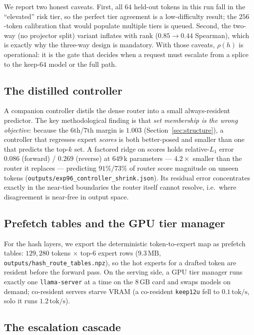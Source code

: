 \documentclass[11pt]{article}
\newcommand{\keepm}[1]{\texttt{keep#1}}
\newcommand{\code}[1]{\texttt{#1}}
\newcommand{\gb}{\,\textrm{GB}}
\newcommand{\tps}{\,\textrm{tok/s}}
\begin{document}
We report two honest caveats. First, all $64$ held-out tokens in this run fall
in the ``elevated'' risk tier, so the perfect tier agreement is a low-difficulty
result; the $256$-token calibration that would populate multiple tiers is queued.
Second, the two-way (no projector split) variant inflates with rank ($0.85\to
0.44$ Spearman), which is exactly why the three-way design is mandatory. With
those caveats, $\rho(h)$ is operational: it is the gate that decides when a
request must escalate from a splice to the keep-$64$ model or the full path.

\subsection{The distilled controller}
\label{sec:controller}

A companion controller distils the dense router into a small always-resident
predictor. The key methodological finding is that \emph{set membership is the
wrong objective}: because the $6$th/$7$th margin is $1.003$
(Section~\ref{sec:structure}), a controller that regresses expert \emph{scores}
is both better-posed and smaller than one that predicts the top-$k$ set. A
factored ridge on scores holds relative-$L_1$ error $0.086$ (forward) / $0.269$
(reverse) at $649\,\textrm{k}$ parameters --- $4.2\times$ smaller than the router
it replaces --- predicting $91\%/73\%$ of router score magnitude on unseen
tokens (\code{outputs/exp96\_controller\_shrink.json}). Its residual error
concentrates exactly in the near-tied boundaries the router itself cannot
resolve, i.e.\ where disagreement is near-free in output space.

\subsection{Prefetch tables and the GPU tier manager}

For the hash layers, we export the deterministic token-to-expert map as prefetch
tables: $129{,}280$ tokens $\times$ top-$6$ expert rows ($9.3\,\textrm{MB}$,
\code{outputs/hash\_route\_tables.npz}), so the hot experts for a drafted token
are resident before the forward pass. On the serving side, a GPU tier manager
runs exactly one \code{llama-server} at a time on the $8\gb{}$ card and swaps
models on demand; co-resident servers starve VRAM (a co-resident \keepm{12u} fell
to $0.1\tps{}$, solo it runs $1.2\tps{}$).

\subsection{The escalation cascade}
\label{sec:escalation}
\end{document}
